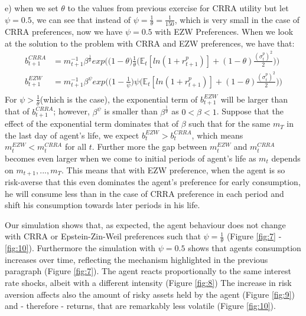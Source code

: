 \documentclass[12pt,a4paper]{article}
\begin{document}
e) when we set $\theta$ to the values from previous exercise for CRRA utility but let $\psi=0.5$, we can see that instead of $\psi=\frac{1}{\theta}=\frac{1}{150}$, which is very small in the case of CRRA preferences, now we have $\psi=0.5$ with EZW Preferences. When we look at the solution to the problem with CRRA and EZW preferences, we have that:
\begin{align*}
    b_{t+1}^{CRRA}&=m_{t+1}^{-1}\beta^{\frac{1}{\theta}}  exp\bigg(\bigg  (1-\theta\bigg)\frac{1}{\theta}\bigg(\mathbb{E}_t[ln(1+r^p_{t+1})]+(1-\theta)\frac{(\sigma_t^p)^2}{2}\bigg)\bigg)\\
     b_{t+1}^{EZW}&=m_{t+1}^{-1}\beta^\psi exp\bigg(\bigg(1-\frac{1}{\psi}\bigg)\psi\bigg(\mathbb{E}_t[ln(1+r^p_{t+1})]+(1-\theta)\frac{(\sigma_t^p)^2}{2}\bigg)\bigg)\\
\end{align*}
For $\psi>\frac{1}{\theta}$(which is the case), the exponential term of $b_{t+1}^{EZW}$ will be larger than that of $b_{t+1}^{CRRA}$; however, $\beta^\psi$ is smaller than $\beta^\frac{1}{\theta}$ as $0<\beta<1$. Suppose that the effect of the exponential term dominates that of $\beta$ such that for the same $m_T$ in the last day of agent's life, we expect $b_t^{EZW}>b_t^{CRRA}$, which means $m_t^{EZW}<m_t^{CRRA}$ for all $t$. Further more the gap between $m_t^{EZW}$ and $m_t^{CRRA}$ becomes even larger when we come to initial periods of agent's life as $m_t$ depends on $m_{t+1},...,m_T$. This means that with EZW preference, when the agent is so risk-averse that this even dominates the agent's preference for early consumption, he will consume less than in the case of CRRA preference in each period and shift his consumption towards later periods in his life.

Our simulation shows that, as expected, the agent behaviour does not change with CRRA or Epstein-Zin-Weil preferences such that $\psi=\frac{1}{\theta}$ (Figure \ref{fig:7} - \ref{fig:10}). Furthermore the simulation with $\psi = 0.5$ shows that agents consumption increases over time, reflecting the mechanism highlighted in the previous paragraph (Figure \ref{fig:7}). The agent reacts proportionally to the same interest rate shocks, albeit with a different intensity (Figure \ref{fig:8}) The increase in risk aversion affects also the amount of risky assets held by the agent (Figure \ref{fig:9}) and - therefore - returns, that are remarkably less volatile (Figure \ref{fig:10}).
\end{document}
